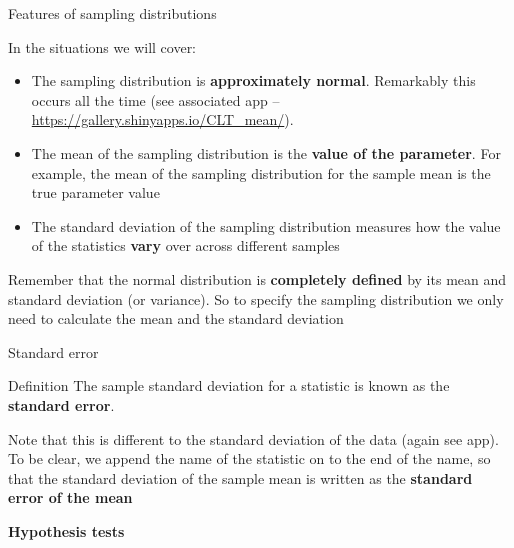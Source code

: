 \documentclass[12pt,xcolor=dvipsnames,handout,mathserif,aspectratio=169]{beamer}
\newcommand{\bbl}[1]{{\color{NavyBlue} \textbf{#1}}}
\newcommand{\bre}[1]{{\color{red} \textbf{#1}}}
\newcommand{\bgr}[1]{{\color{PineGreen} \textbf{#1}}}
\begin{document}
\begin{frame}{Features of sampling distributions}

In the situations we will cover:
\begin{itemize}
\item The sampling distribution is \bbl{approximately normal}. Remarkably this occurs all the time (see associated app -- \url{https://gallery.shinyapps.io/CLT_mean/}).
\item The mean of the sampling distribution is the \bre{value of the parameter}. For example, the mean of the sampling distribution for the sample mean is the true parameter value
\item The standard deviation of the sampling distribution measures how the value of the statistics \bre{vary} over across different samples
\end{itemize}
\pause
Remember that the normal distribution is \bgr{completely defined} by its mean and standard deviation (or variance). So to specify the sampling distribution we only need to calculate the mean and the standard deviation

\end{frame}

\begin{frame}{Standard error}

\begin{block}{Definition}
The sample standard deviation for a statistic is known as the \bre{standard error}.
\end{block}
\vspace{0.5cm}
\pause
Note that this is different to the standard deviation of the data (again see app). To be clear, we append the name of the statistic on to the end of the name, so that the standard deviation of the sample mean is written as the \bbl{standard error of the mean}
\end{frame}

\begin{frame}[fragile]{}
\bbl{\Huge Hypothesis tests}\\ 
\vspace{0.5cm}
\end{frame}
\end{document}
